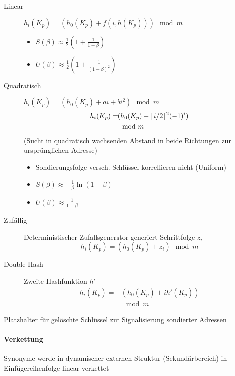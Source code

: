 \begin{description}
  \item[Linear] $h_i(K_p) = (h_0(K_p) + f(i, h(K_p))) \mod m$

    \begin{itemize}
      \item $S(\beta) \approx \frac{1}{2}(1 + \frac{1}{1 - \beta})$
      \item $U(\beta) \approx \frac{1}{2}(1 + \frac{1}{(1 - \beta)^2})$
    \end{itemize}

  \item[Quadratisch] $h_i(K_p) = (h_0(K_p) + ai + bi^2) \mod m$
    \begin{align*}
      h_i(K_p) = & (h_0(K_p) - \lceil i/2\rceil^2(-1)^i) \\
                 & \mod m
    \end{align*}
    (Sucht in quadratisch wachsenden Abstand in beide Richtungen zur ursprünglichen Adresse)

    \begin{itemize}
      \item Sondierungsfolge versch. Schlüssel korrellieren nicht (Uniform)
      \item $S(\beta) \approx - \frac{1}{\beta} \ln (1 - \beta)$
      \item $U(\beta) \approx \frac{1}{1 - \beta}$
    \end{itemize}


  \item [Zufällig]
        Deterministischer Zufallsgenerator generiert Schrittfolge $z_i$
        $$h_i(K_p) = (h_0(K_p) + z_i) \mod m$$

  \item [Double-Hash] Zweite Hashfunktion $h'$
        \begin{align*}
          h_i(K_p) = & (h_0(K_p) + ih'(K_p)) \\
                     & \mod m
        \end{align*}
\end{description}

Platzhalter für gelöschte Schlüssel zur Signalisierung sondierter Adressen

\paragraph{Verkettung}
Synonyme werde in dynamischer externen Struktur (Sekundärbereich) in Einfügereihenfolge linear verkettet

